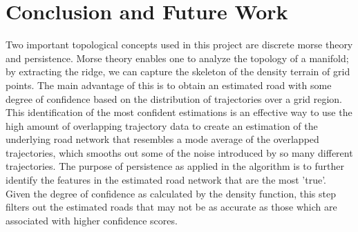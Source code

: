 \documentclass[11pt]{article}
\begin{document}
\section*{Conclusion and Future Work}


Two important topological concepts used in this project are discrete morse theory and persistence.  Morse theory enables one to analyze the topology of a manifold; by extracting the ridge, we can capture the skeleton of the density terrain of grid points. The main advantage of this is to obtain an estimated road with some degree of confidence based on the distribution of trajectories over a grid region. This identification of the most confident estimations is an effective way to use the high amount of overlapping trajectory data to create an estimation of the underlying road network that resembles a  mode average of the overlapped trajectories, which smooths out some of the noise introduced by so many different trajectories. The purpose of persistence as applied in the algorithm is to further identify the features in the estimated road network that are the most 'true'. Given the degree of confidence as calculated by the density function, this step filters out the estimated roads that may not be as accurate as those which are associated with higher confidence scores.  %
\end{document}
